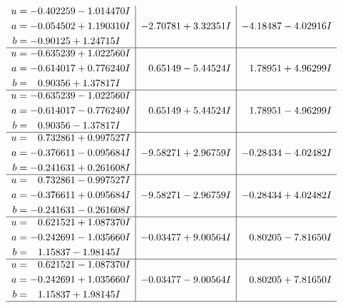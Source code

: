 \documentclass[1p]{elsarticle_modified}
\theoremstyle{definition}
\begin{document}
$$\begin{array}{c|c|c}
\begin{aligned}
u &= -0.402259 - 1.014470 I \\
a &= -0.054502 + 1.190310 I \\
b &= -0.90125 + 1.24715 I\end{aligned}
 & -2.70781 + 3.32351 I & -4.18487 - 4.02916 I \\ \hline\begin{aligned}
u &= -0.635239 + 1.022560 I \\
a &= -0.614017 + 0.776240 I \\
b &= \phantom{-}0.90356 + 1.37817 I\end{aligned}
 & \phantom{-}0.65149 - 5.44524 I & \phantom{-}1.78951 + 4.96299 I \\ \hline\begin{aligned}
u &= -0.635239 - 1.022560 I \\
a &= -0.614017 - 0.776240 I \\
b &= \phantom{-}0.90356 - 1.37817 I\end{aligned}
 & \phantom{-}0.65149 + 5.44524 I & \phantom{-}1.78951 - 4.96299 I \\ \hline\begin{aligned}
u &= \phantom{-}0.732861 + 0.997527 I \\
a &= -0.376611 - 0.095684 I \\
b &= -0.241631 + 0.261608 I\end{aligned}
 & -9.58271 + 2.96759 I & -0.28434 - 4.02482 I \\ \hline\begin{aligned}
u &= \phantom{-}0.732861 - 0.997527 I \\
a &= -0.376611 + 0.095684 I \\
b &= -0.241631 - 0.261608 I\end{aligned}
 & -9.58271 - 2.96759 I & -0.28434 + 4.02482 I \\ \hline\begin{aligned}
u &= \phantom{-}0.621521 + 1.087370 I \\
a &= -0.242691 - 1.035660 I \\
b &= \phantom{-}1.15837 - 1.98145 I\end{aligned}
 & -0.03477 + 9.00564 I & \phantom{-}0.80205 - 7.81650 I \\ \hline\begin{aligned}
u &= \phantom{-}0.621521 - 1.087370 I \\
a &= -0.242691 + 1.035660 I \\
b &= \phantom{-}1.15837 + 1.98145 I\end{aligned}
 & -0.03477 - 9.00564 I & \phantom{-}0.80205 + 7.81650 I\\
 \hline 
 \end{array}$$\newpage
\end{document}
